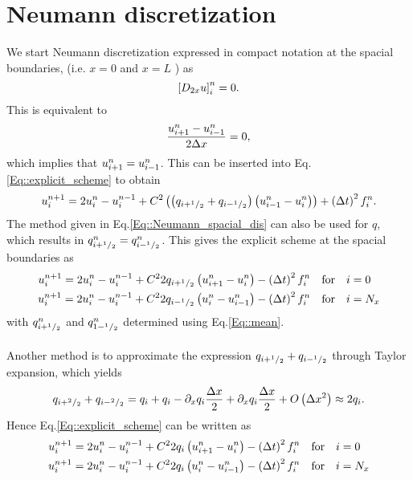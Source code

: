 \documentclass[11pt]{article}
\begin{document}
\section{Neumann discretization}
\label{sec::Neum}
We start Neumann discretization expressed in compact notation at the spacial boundaries, (i.e. $x=0$ and $x =L $ ) as
\begin{equation}
\left[ D_{2x} u\right]\sp{n}_i = 0 .
\label{Eq::Neumann_spacial_dis}
\end{equation}
This is equivalent to
\begin{equation}
\frac{u\sp{n}_{i+1} - u\sp{n}_{i-1}}{2\Delta x} = 0  ,
\end{equation}
which implies that $u\sp{n}_{i+1} = u\sp{n}_{i-1}$. This can be inserted into Eq.\ref{Eq::explicit_scheme} to obtain
\begin{equation}
u\sp{n+1}_i  =  2u\sp{n}_i-u\sp{n-1}_i + C\sp{2} \left(\left( q_{i+\sp{1}/_{2}} +  q_{i-\sp{1}/_{2}} \right) \left( u\sp{n}_{i-1} -u\sp{n}_{i} \right) \right) +  \left(\Delta t\right)\sp{2}f\sp{n}_i .
\end{equation}
The method given in Eq.\ref{Eq::Neumann_spacial_dis} can also be used for $q$, which results in $q\sp{n}_{i+\sp{1}/_{2}} =  q\sp{n}_{i-\sp{1}/_{2}}$.
This gives the explicit scheme at the spacial boundaries as
\begin{equation}
\begin{aligned}
u\sp{n+1}_i  =  2u\sp{n}_i-u\sp{n-1}_i + C\sp{2}2 q_{i+\sp{1}/_{2}}\left(  u\sp{n}_{i+1} -u\sp{n}_{i} \right) -\left(\Delta t\right)\sp{2}f\sp{n}_i &\quad \text{for} \quad i=0 \\
u\sp{n+1}_i  =  2u\sp{n}_i-u\sp{n-1}_i + C\sp{2} 2 q_{i-\sp{1}/_{2}}\left(  u\sp{n}_{i} -u\sp{n}_{i-1} \right) -\left(\Delta t\right)\sp{2}f\sp{n}_i  &\quad \text{for} \quad i=N_x
\end{aligned}
\end{equation}
with $q\sp{n}_{i+\sp{1}/_{2}}$ and $q\sp{n}_{1-\sp{1}/_{2}}$ determined using Eq.\ref{Eq::mean}.
\\\\
Another method is to approximate the expression $ q_{i+\sp{1}/_{2}} +  q_{i-\sp{1}/_{2}}$ through Taylor expansion, which yields
\begin{equation}
q_{i+\sp{2}/_{2}} + q_{i-\sp{2}/_{2}} = q_i + q_i - \partial_x q_i\frac{\Delta x}{2} +  \partial_x q_i\frac{\Delta x}{2}  + O\left( \Delta x\sp{2}\right) \approx 2q_i .
\end{equation}
Hence Eq.\ref{Eq::explicit_scheme} can be written as  
\begin{equation}
\begin{aligned}
u\sp{n+1}_i  =  2u\sp{n}_i-u\sp{n-1}_i + C\sp{2}  2q_{i} \left(  u\sp{n}_{i+1} -u\sp{n}_{i} \right) -\left(\Delta t\right)\sp{2}f\sp{n}_i &\quad \text{for} \quad i=0 \\
u\sp{n+1}_i  =  2u\sp{n}_i-u\sp{n-1}_i + C\sp{2} 2q_{i} \left(  u\sp{n}_{i} -u\sp{n}_{i-1} \right) -\left(\Delta t\right)\sp{2}f\sp{n}_i  &\quad \text{for} \quad i=N_x
\end{aligned}
\end{equation}
\end{document}
